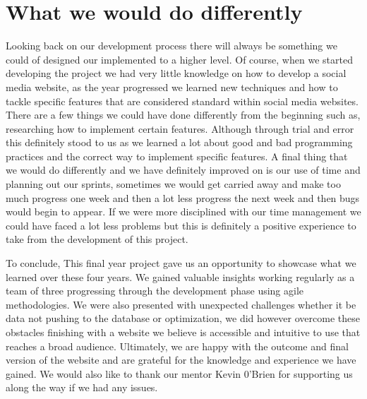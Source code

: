 \section{What we would do differently}
\newline
Looking back on our development process there will always be something we could of designed our implemented to a higher level. Of course, when we started developing the project we had very little knowledge on how to develop a social media website, as the year progressed we learned new techniques and how to tackle specific features that are considered standard within social media websites. There are a few things we could have done differently from the beginning such as, researching how to implement certain features. Although through trial and error this definitely stood to us as we learned a lot about good and bad programming practices and the correct way to implement specific features. A final thing that we would do differently and we have definitely improved on is our use of time and planning out our sprints, sometimes we would get carried away and make too much progress one week and then a lot less progress the next week and then bugs would begin to appear. If we were more disciplined with our time management we could have faced a lot less problems but this is definitely a positive experience to take from the development of this project.
\newline

To conclude, This final year project gave us an opportunity to showcase what we learned over these four years. We gained valuable insights working regularly as a team of three progressing through the development phase using agile methodologies.
We were also presented with unexpected challenges whether it be data not pushing to the database or optimization, we did however overcome these obstacles finishing with a website we believe is accessible and intuitive to use that reaches a broad audience.
\newline
Ultimately, we are happy with the outcome and final version of the website and are grateful for the knowledge and experience we have gained. We would also like to thank our mentor Kevin 0'Brien for supporting us along the way if we had any issues.

\cite{githublink}
